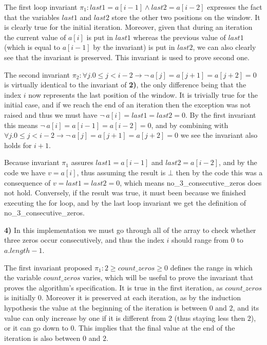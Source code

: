 \documentclass[]{StandardTemplate}
\begin{document}
The first loop invariant $ \pi_1 : last1=a[i-1] \land last2= a[i-2]$ expresses the fact that the variables $ last1 $ and $ last2 $ store the other two positions on the window. It is clearly true for the initial iteration. Moreover, given that during an iteration the current value of $ a[i] $ is put in $ last1 $ whereas the previous value of $ last1 $ (which is equal to $ a[i-1] $ by the invariant) is put in $ last2 $, we can also clearly see that the invariant is preserved. This invariant is used to prove second one.

The second invariant $\pi_2 :  \forall j. 0 \leq j < i-2 \to \neg~a[j]=a[j+1]=a[j+2]=0 $ is virtually identical to the invariant of \textbf{2)}, the only difference being that the index $ i $ now represents the last position of the window. It is trivially true for the initial case, and if we reach the end of an iteration then the exception was not raised and thus we must have $ \neg~a[i]=last1=last2 =0 $. By the first invariant this means $ \neg~a[i]=a[i-1]=a[i-2]=0 $, and by combining with $\forall j. 0 \leq j < i-2 \to \neg~a[j]=a[j+1]=a[j+2]=0 $ we see the invariant also holds for $ i+1 $.

Because invariant $ \pi_1 $ assures $ last1 = a[i-1] $ and $ last2 = a[i-2] $, and by the code we have $ v =a[i] $, thus assuming the result is $ \bot $ then by the code this was a consequence of $ v=last1=last2 =0 $, which means no\_3\_consecutive\_zeros does not hold. Conversely, if the result was true, it must been because we finished executing the for loop, and by the last loop invariant we get the definition of no\_3\_consecutive\_zeros.

\textbf{4)} In this implementation we must go through all of the array to check whether three zeros occur consecutively, and thus the index $ i$ should range from $ 0$ to $ a.length-1$.

The first invariant proposed $\pi_1 : 2 \geq count\_zeros \geq 0$ defines the range in which the variable $ count\_zeros$ varies, which will be useful to prove the invariant that proves the algorithm's specification. It is true in the first iteration, as $ count\_zeros$ is initially $ 0 $. Moreover it is preserved at each iteration, as by the induction hypothesis the value at the beginning of the iteration is between $ 0 $ and $ 2 $, and its value can only increase by one if it is different from $ 2 $ (thus staying less then $ 2 $), or it can go down to $ 0 $. This implies that the final value at the end of the iteration is also between $ 0 $ and $ 2 $.
\end{document}
